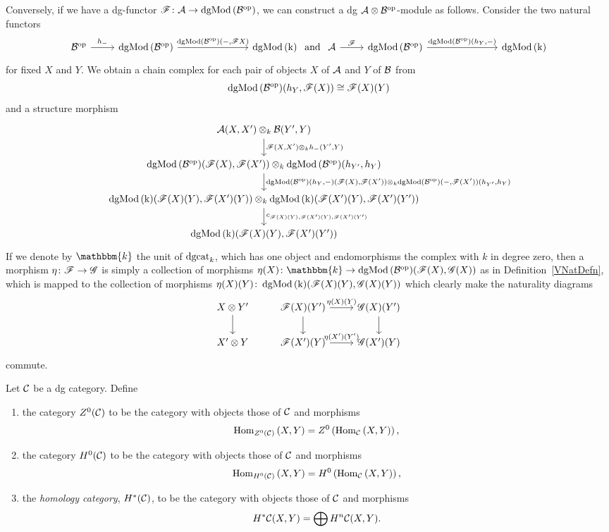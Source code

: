 \documentclass[dissertation.tex]{subfiles}
\begin{document}
\begin{rmk}
  Conversely, if we have a dg-functor $\mathscr{F} \colon \mathcal{A} \to \operatorname{dgMod\left(\mathcal{B}^{\operatorname{op}}\right)}$, we can construct a dg $\mathcal{A} \otimes \mathcal{B}^{\operatorname{op}}$-module as follows.
  Consider the two natural functors
  $$\begin{tikzcd}
    \B^\opp \arrow{r}{h_-} & \cdg{\B^\opp} \arrow{rrr}{\cdg{\B^\opp}(-, \F X)} &&& \cdg{k}
  \end{tikzcd}
  \ \text{and}\ 
  \begin{tikzcd}
    \A \arrow{r}{\F} & \cdg{\B^\opp} \arrow{rrr}{\cdg{\B^\opp}(h_Y, -)} &&& \cdg{k}
  \end{tikzcd}$$
  for fixed $X$ and $Y$.
  We obtain a chain complex for each pair of objects $X$ of $\mathcal{A}$ and $Y$ of $\mathcal{B}$ from
  $$\operatorname{dgMod\left(\mathcal{B}^{\operatorname{op}}\right)}(h_Y, \mathscr{F}(X)) \cong \mathscr{F}(X)(Y)$$
  and a structure morphism
  $$\begin{tikzcd}
    \A(X,X^\prime) \otimes_k \B(Y^\prime, Y)\arrow{d}{\F(X,X^\prime) \otimes_k h_-(Y^\prime, Y)}\\
    \cdg{\B^\opp}(\F(X), \F(X^\prime)) \otimes_k \cdg{\B^\opp}(h_{Y^\prime}, h_Y)\arrow{d}{\cdg{\B^\opp}(h_Y, -)(\F(X),\F(X^\prime)) \otimes_k \cdg{\B^\opp}(-, \F(X^\prime))(h_{Y^\prime}, h_Y)}\\
    \cdg{k}(\F(X)(Y), \F(X^\prime)(Y)) \otimes_k \cdg{k}(\F(X^\prime)(Y), \F(X^\prime)(Y^\prime))\arrow{d}{c_{\F(X)(Y), \F(X^\prime)(Y), \F(X^\prime)(Y^\prime)}}\\
    \cdg{k}(\F(X)(Y), \F(X^\prime)(Y^\prime))
  \end{tikzcd}$$
  If we denote by $\mathbbm{k}$ the unit of $\operatorname{dgcat}_k$, which has one object and endomorphisms the complex with $k$ in degree zero, then a morphism $\eta \colon \mathscr{F} \to \mathscr{G}$ is simply a collection of morphisms $\eta(X) \colon \mathbbm{k} \to \cdg{\B^\opp}(\F(X),\G(X))$ as in Definition~\ref{VNatDefn}, which is mapped to the collection of morphisms $\eta(X)(Y) \colon \operatorname{dgMod\left(k\right)}(\mathscr{F}(X)(Y),\mathscr{G}(X)(Y))$ which clearly make the naturality diagrams
  $$\begin{tikzcd}
    X \otimes Y^\prime \arrow{d} & \F(X)(Y^\prime) \arrow{r}{\eta(X)(Y)}\arrow{d} & \G(X)(Y^\prime)\arrow{d}\\
    X^\prime \otimes Y & \F(X^\prime)(Y) \arrow{r}{\eta(X^\prime)(Y^\prime)} & \G(X^\prime)(Y)
  \end{tikzcd}$$
  commute.
\end{rmk}

\begin{defn}
  Let $\mathcal{C}$ be a dg category.
  Define
  \begin{enumerate}
  \item
    the category $Z^0(\mathcal{C})$ to be the category with objects those of $\mathcal{C}$ and morphisms
    $$\operatorname{Hom}_{Z^0(\mathcal{C})}\left(X,Y\right) = Z^0\left(\operatorname{Hom}_{\mathcal{C}}\left(X,Y\right)\right),$$
  \item
    the category $H^0(\mathcal{C})$ to be the category with objects those of $\mathcal{C}$ and morphisms
    $$\operatorname{Hom}_{H^0(\mathcal{C})}\left(X,Y\right) = H^0\left(\operatorname{Hom}_{\mathcal{C}}\left(X,Y\right)\right),$$
  \item
    the {\it homology category}, $H^\ast(\mathcal{C})$, to be the category with objects those of $\mathcal{C}$ and morphisms 
    $$H^\ast\mathcal{C}(X,Y) = \bigoplus H^n\mathcal{C}(X,Y).$$
  \end{enumerate}
\end{defn}
\end{document}
